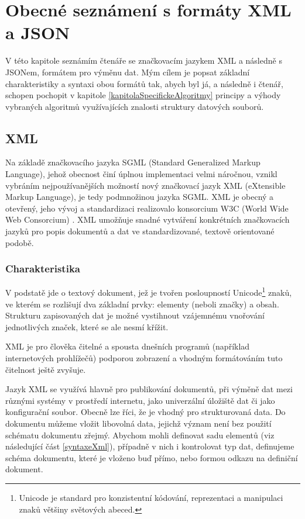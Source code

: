 \chapter{Obecné seznámení s formáty XML a JSON}
V této kapitole seznámím čtenáře se značkovacím jazykem XML a následně s JSONem, formátem pro výměnu dat. Mým cílem je popsat základní charakteristiky a syntaxi obou formátů tak, abych byl já, a následně i čtenář, schopen pochopit v kapitole \ref{kapitolaSpecifickeAlgoritmy} principy a výhody vybraných algoritmů využívajících znalosti struktury datových souborů.

\section{XML}
Na základě značkovacího jazyka SGML (Standard Generalized Markup Language), jehož obecnost činí úplnou implementaci velmi náročnou, vznikl vybráním nejpoužívanějších možností nový značkovací jazyk XML (eXtensible Markup Language), je tedy podmnožinou jazyka SGML. XML je obecný a otevřený, jeho vývoj a standardizaci realizovalo konsorcium W3C (World Wide Web Consorcium) \cite{w3cxml}. XML umožňuje snadné vytváření konkrétních značkovacích jazyků pro popis dokumentů a dat ve standardizované, textově orientované podobě.

\subsection{Charakteristika}
V podstatě jde o textový dokument, jež je tvořen posloupností Unicode\footnote{Unicode je standard pro konzistentní kódování, reprezentaci a manipulaci znaků většiny světových abeced.} znaků, ve kterém se rozlišují dva základní prvky: elementy (neboli značky) a obsah. Strukturu zapisovaných dat je možné vystihnout vzájemnému vnořování jednotlivých značek, které se ale nesmí křížit.

XML je pro člověka čitelné a spousta dnešních programů (například internetových prohlížečů) podporou zobrazení a vhodným formátováním tuto čitelnost ještě zvyšuje.

Jazyk XML se využívá hlavně pro publikování dokumentů, při výměně dat mezi různými systémy v prostředí internetu, jako univerzální úložiště dat či jako konfigurační soubor. Obecně lze říci, že je vhodný pro strukturovaná data. Do dokumentu můžeme vložit libovolná data, jejichž význam není bez použití schématu dokumentu zřejmý. Abychom mohli definovat sadu elementů (viz následující část \ref{syntaxeXml}), případně v nich i kontrolovat typ dat, definujeme schéma dokumentu, které je vloženo buď přímo, nebo formou odkazu na definiční dokument.

